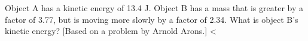 Object A has a kinetic energy of 13.4 J. Object B
has a mass that is greater by a factor of 3.77, but is
moving more slowly by a factor of 2.34. What is object B's kinetic energy?
[Based on a problem by Arnold Arons.]
<%
